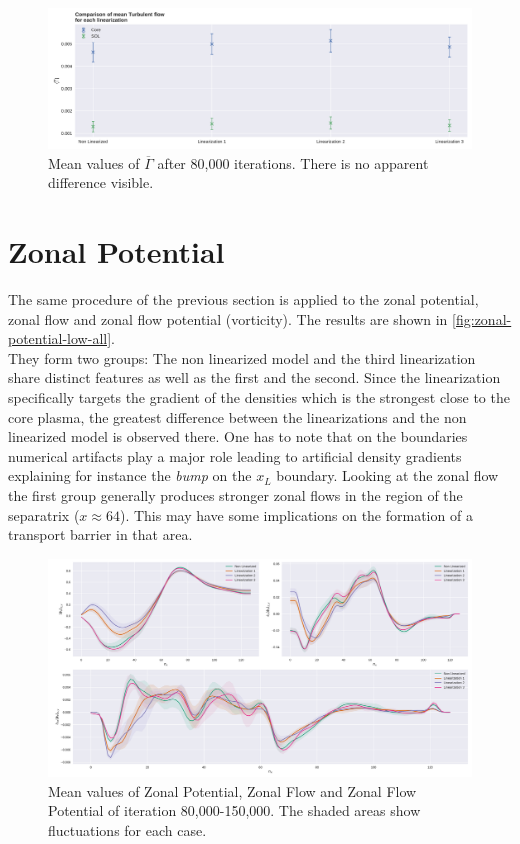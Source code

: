 \documentclass[master.tex]{subfiles}
\newcommand{\Tflow}[0]{\overline{\Gamma}}
\begin{document}
\begin{figure}[!htbp]
    \includegraphics[width=\linewidth]{pdfs/turbulent-flow-low-means.pdf}
    \caption{Mean values of $\Tflow$ after 80,000 iterations. There is no apparent difference visible.}
    \label{fig:turbulent-flow-low-means}
\end{figure}

\section{Zonal Potential}

The same procedure of the previous section is applied to the zonal potential, zonal flow and zonal flow potential (vorticity). The results are shown in \autoref{fig:zonal-potential-low-all}.\\
They form two groups: The non linearized model and the third linearization share distinct features as well as the first and the second. Since the linearization specifically targets the gradient of the densities which is the strongest close to the core plasma, the greatest difference between the linearizations and the non linearized model is observed there. One has to note that on the boundaries numerical artifacts play a major role leading to artificial density gradients explaining for instance the \textit{bump} on the $x_L$ boundary. Looking at the zonal flow the first group generally produces stronger zonal flows in the region of the separatrix ($x\approx 64$). This may have some implications on the formation of a transport barrier in that area.

\begin{figure}[!htbp]
    \includegraphics[width=\linewidth]{pdfs/zonal_potential_low.pdf}
    \caption{Mean values of Zonal Potential, Zonal Flow and Zonal Flow Potential of iteration 80,000-150,000. The shaded areas show fluctuations for each case.}
    \label{fig:zonal-potential-low-all}
\end{figure}
\end{document}
